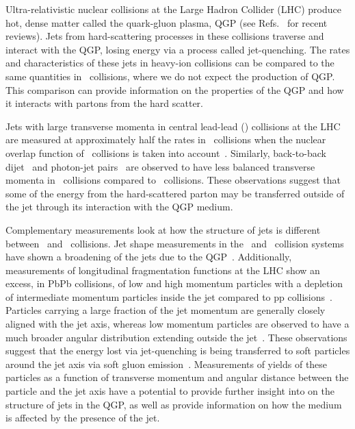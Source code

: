 
Ultra-relativistic nuclear collisions at the Large Hadron Collider (LHC) produce hot, dense matter called the quark-gluon plasma, QGP (see Refs.~\cite{Roland:2014jsa,Busza:2018rrf} for recent reviews).
Jets from hard-scattering processes in these collisions traverse and interact with the QGP, losing energy via a process called jet-quenching.
The rates and characteristics of these jets in heavy-ion collisions can be compared to the same quantities in \pp\ collisions, where we do not expect the production of QGP.
This comparison can provide information on the properties of the QGP and how it interacts with partons from the hard scatter.

Jets with large transverse momenta in central lead-lead (\pbpb) collisions at the LHC are measured at approximately half the rates in \pp\ collisions when the nuclear overlap function of \pbpb\ collisions is taken into account~\cite{Abelev:2013kqa,Aad:2014bxa,Adam:2015ewa,Khachatryan:2016jfl, 2019108}.
Similarly, back-to-back dijet~\cite{Aad:2010bu,Chatrchyan:2011sx,Aaboud:2017eww} and photon-jet pairs~\cite{Chatrchyan:2012gt,Aaboud:2018anc} are observed to have less balanced transverse momenta in \pbpb\ collisions compared to \pp\ collisions.
These observations suggest that some of the energy from the hard-scattered parton may be transferred outside of the jet through its interaction with the QGP medium.
 
Complementary measurements look at how the structure of jets is different between \pbpb\ and \pp\ collisions.
Jet shape measurements in the \pp\ and \pbpb\ collision systems have shown a broadening of the jets due to the QGP~\cite{Aad:2011sc, Acharya:2018uvf, Chatrchyan:2012mec, Chatrchyan:2013kwa}.
Additionally, measurements of longitudinal fragmentation functions at the LHC show an excess, in PbPb collisions, of low and high momentum particles with a depletion of intermediate momentum particles inside the jet compared to pp collisions~\cite{Aad:2014wha,Chatrchyan:2014ava,Aaboud:2017bzv,Aaboud:2018hpb}.
Particles carrying a large fraction of the jet momentum are generally closely aligned with the jet axis, whereas low momentum particles are observed to have a much broader angular distribution extending outside the jet~\cite{Chatrchyan:2011sx,Khachatryan:2015lha,Khachatryan:2016tfj,Sirunyan:2018jqr}.
These observations suggest that the energy lost via jet-quenching is being transferred to soft particles around the jet axis via soft gluon emission~\cite{Vitev:2008rz,Ovanesyan:2011xy,Blaizot:2014ula,Qin:2015srf,Escobedo:2016jbm,Casalderrey-Solana:2016jvj,Tachibana:2017syd}.
Measurements of yields of these particles as a function of transverse momentum and angular distance between the particle and the jet axis have a potential to provide further insight into on the structure of jets in the QGP, as well as provide information on how the medium is affected by the presence of the jet.


